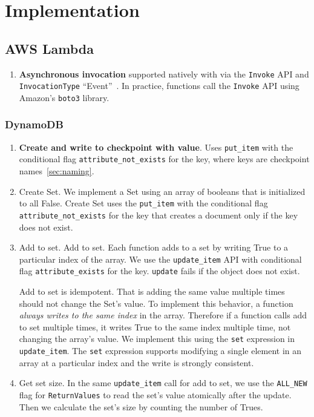 \section{Implementation}\label{sec:impl}

\subsection{AWS Lambda}

\begin{enumerate}
  \item \textbf{Asynchronous invocation} supported natively with via the \texttt{Invoke} API and \texttt{InvocationType} ``Event''~\cite{aws-asyn-invoke}. In practice, functions call the \texttt{Invoke} API using Amazon's \texttt{boto3} library.
\end{enumerate}

\subsubsection{DynamoDB}

\begin{enumerate}
  \item \textbf{Create and write to checkpoint with value}. Uses \texttt{put\_item} with the conditional flag \texttt{attribute\_not\_exists} for the key, where keys are checkpoint names~\ref{sec:naming}. 
  \item Create Set. We implement a Set using an array of booleans that is initialized to all False. Create Set uses the \texttt{put\_item} with the conditional flag \texttt{attribute\_not\_exists} for the key that creates a document only if the key does not exist.
  \item Add to set. Add to set. Each function adds to a set by writing True to a particular index of the array. We use the \texttt{update\_item} API with conditional flag \texttt{attribute\_exists} for the key. \texttt{update} fails if the object does not exist.

  Add to set is idempotent. That is adding the same value multiple times should not change the Set's value. To implement this behavior, a function \emph{always writes to the same index} in the array. Therefore if a function calls add to set multiple times, it writes True to the same index multiple time, not changing the array's value. We implement this using the \texttt{set} expression in \texttt{update\_item}. The \texttt{set} expression supports modifying a single element in an array at a particular index and the write is strongly consistent.

  \item Get set size. In the same \texttt{update\_item} call for add to set, we use the \texttt{ALL\_NEW} flag for \texttt{ReturnValues} to read the set's value atomically after the update. Then we calculate the set's size by counting the number of Trues.
\end{enumerate}

